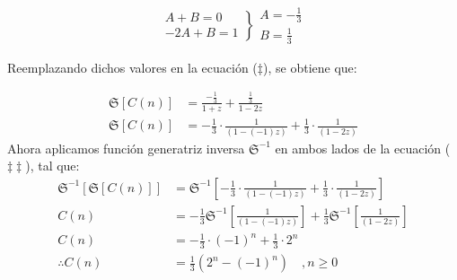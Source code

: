 \begin{solution}
$$
  \left.
    \begin{array}{l}
       A + B = 0\\
      -2A + B = 1
      \end{array}
  \right\}
  \begin{array}{l}
       A= -\frac{1}{3}  \\
       B= \frac{1}{3}
  \end{array}
$$

Reemplazando dichos valores en la ecuación ($\ddagger$), se obtiene que:

\begin{align*}
    \mathfrak{S}\left[ C(n) \right] &= \frac{-\frac{1}{3}}{1+z} + \frac{\frac{1}{3}}{1-2z}\\
    \mathfrak{S}\left[ C(n) \right] &= -\frac{1}{3}\cdot \frac{1}{(1-(-1)z)} + \frac{1}{3}\cdot\frac{1}{(1-2z)} \tag{$\ddagger\ddagger$}
\end{align*}
Ahora aplicamos función generatriz inversa $\mathfrak{S}^{-1}$ en ambos lados de la ecuación ($\ddagger\ddagger$), tal que:
\begin{align*}
    \mathfrak{S}^{-1}\left[ \mathfrak{S}\left[ C(n) \right] \right] &= \mathfrak{S}^{-1}\left[ -\frac{1}{3}\cdot \frac{1}{(1-(-1)z)} + \frac{1}{3}\cdot\frac{1}{(1-2z)} \right] \\
    C(n) &= -\frac{1}{3}\mathfrak{S}^{-1}\left[\frac{1}{(1-(-1)z)} \right] + \frac{1}{3}\mathfrak{S}^{-1}\left[\frac{1}{(1-2z)} \right]\\
    C(n)&=-\frac{1}{3}\cdot(-1)^{n} + \frac{1}{3}\cdot 2^n \\
    \therefore C(n) &= \frac{1}{3}\left(2^n -(-1)^n\right)\quad, n\ge0
\end{align*}
\end{solution}